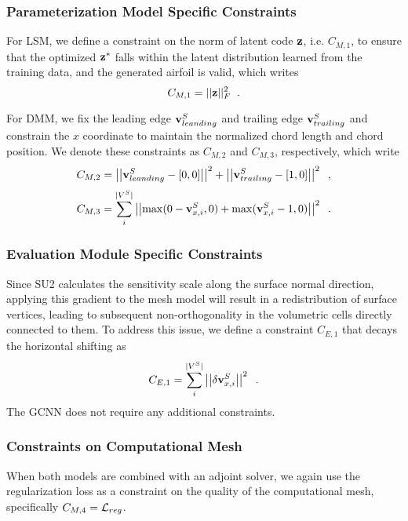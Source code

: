 


\subsubsection{Parameterization Model Specific Constraints}
For LSM, we define a constraint on the norm of latent code $\mathbf{z}$, i.e. $C_{M,1}$, to ensure that the optimized $\mathbf{z}^*$ falls within the latent distribution learned from the training data, and the generated airfoil is valid, which writes
\begin{equation}
    C_{M,1} = ||\mathbf{z}||^2_F\;\;.
\end{equation}

For DMM, we fix the leading edge $\mathbf{v}_{leanding}^S$ and trailing edge $\mathbf{v}_{trailing}^S$ and constrain the $x$ coordinate to maintain the normalized chord length and chord position. We denote these constraints as $C_{M,2}$ and $C_{M,3}$, respectively, which write
\begin{equation}
    C_{M,2}=\left|\left| \mathbf{v}_{leanding}^S - [0,0] \right|\right|^2 + \left|\left| \mathbf{v}_{trailing}^S - [1,0] \right|\right|^2\;\;,
\end{equation}
\begin{equation}
    C_{M,3}=\sum_i^{|V^S|} \left|\left| \max (0 - \mathbf{v}_{x,i}^S, 0) + \max (\mathbf{v}_{x,i}^S - 1, 0) \right|\right|^2\;\;.
\end{equation}

\subsubsection{Evaluation Module Specific Constraints}
Since SU2 calculates the sensitivity scale along the surface normal direction, applying this gradient to the mesh model will result in a redistribution of surface vertices, leading to subsequent non-orthogonality in the volumetric cells directly connected to them. To address this issue, we define a constraint $C_{E,1}$ that decays the horizontal shifting as
\begin{equation}
    C_{E,1} = \sum_i^{|V^S|} \left|\left| \delta\mathbf{v}_{x,i}^S
 \right|\right|^2\;\;.
\end{equation}
The GCNN does not require any additional constraints.

\subsubsection{Constraints on Computational Mesh}
When both models are combined with an adjoint solver, we again use the regularization loss as a constraint on the quality of the computational mesh, specifically $C_{M,4}=\mathcal{L}_{reg}$. 

